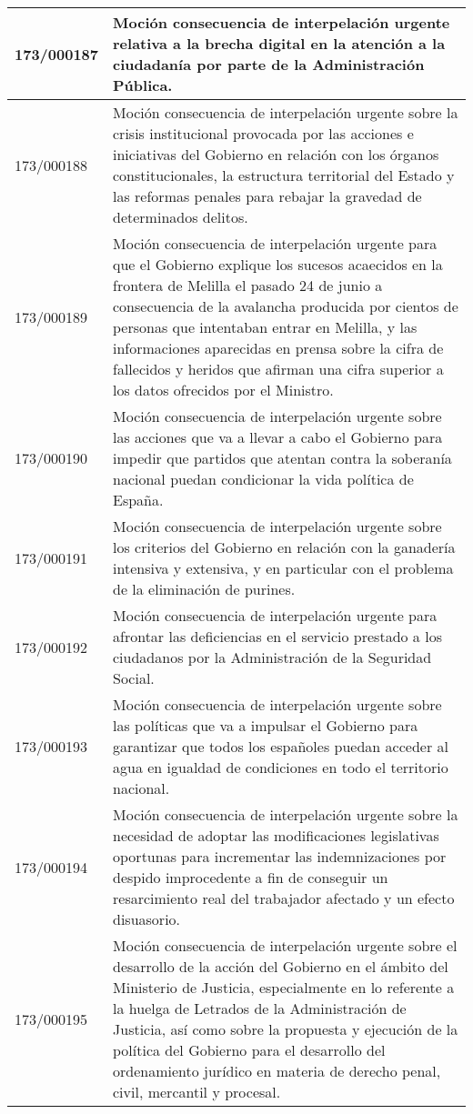 {\begin{table}[H]
\begin{center}
\begin{tabularx}{\linewidth}{| l | X |}
\hline
173/000187 & Moción consecuencia de interpelación urgente relativa a la brecha digital en la atención a la ciudadanía por parte de la Administración Pública. \\
\hline
173/000188 & Moción consecuencia de interpelación urgente sobre la crisis institucional provocada por las acciones e iniciativas del Gobierno en relación con los órganos constitucionales, la estructura territorial del Estado y las reformas penales para rebajar la gravedad de determinados delitos. \\
\hline
173/000189 & Moción consecuencia de interpelación urgente para que el Gobierno explique los sucesos acaecidos en la frontera de Melilla el pasado 24 de junio a consecuencia de la avalancha producida por cientos de personas que intentaban entrar en Melilla, y las informaciones aparecidas en prensa sobre la cifra de fallecidos y heridos que afirman una cifra superior a los datos ofrecidos por el Ministro. \\
\hline
173/000190 & Moción consecuencia de interpelación urgente sobre las acciones que va a llevar a cabo el Gobierno para impedir que partidos que atentan contra la soberanía nacional puedan condicionar la vida política de España. \\
\hline
173/000191 & Moción consecuencia de interpelación urgente sobre los criterios del Gobierno en relación con la ganadería intensiva y extensiva, y en particular con el problema de la eliminación de purines. \\
\hline
173/000192 & Moción consecuencia de interpelación urgente para afrontar las deficiencias en el servicio prestado a los ciudadanos por la Administración de la Seguridad Social. \\
\hline
173/000193 & Moción consecuencia de interpelación urgente sobre las políticas que va a impulsar el Gobierno para garantizar que todos los españoles puedan acceder al agua en igualdad de condiciones en todo el territorio nacional. \\
\hline
173/000194 & Moción consecuencia de interpelación urgente sobre la necesidad de adoptar las modificaciones legislativas oportunas para incrementar las indemnizaciones por despido improcedente a fin de conseguir un resarcimiento real del trabajador afectado y un efecto disuasorio. \\
\hline
173/000195 & Moción consecuencia de interpelación urgente sobre el desarrollo de la acción del Gobierno en el ámbito del Ministerio de Justicia, especialmente en lo referente a la huelga de Letrados de la Administración de Justicia, así como sobre la propuesta y ejecución de la política del Gobierno para el desarrollo del ordenamiento jurídico en materia de derecho penal, civil, mercantil y procesal. \\

\end{tabularx}
\end{center}
\end{table}}
